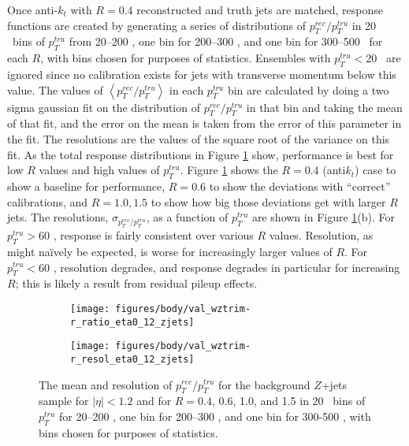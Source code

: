 Once anti-$k_t$ with $R=0.4$ reconstructed and truth jets are matched, response functions are created by generating a series of distributions of $p_T^{rec}/p_T^{tru}$ in 20 \GeV\ bins of $p_T^{tru}$ from 20--200 \GeV, one bin for 200--300 \GeV, and one bin for 300--500 \GeV\ for each $R$, with bins chosen for purposes of statistics.  Ensembles with $p_T^{tru}<20$ \GeV\ are ignored since no calibration exists for jets with transverse momentum below this value.  The values of $\left<p_T^{rec}/p_T^{tru}\right>$ in each $p_T^{tru}$ bin are calculated by doing a two sigma gaussian fit on the distribution of $p_T^{rec}/p_T^{tru}$ in that bin and taking the mean of that fit, and the error on the mean is taken from the error of this parameter in the fit.  The resolutions are the values of the square root of the variance on this fit.  As the total response distributions in Figure \ref{fig:valzjets} show, performance is best for low $R$ values and high values of $p_T^{tru}$.  Figure \ref{fig:valzjets} shows the $R=0.4$ (anti$k_t$) case to show a baseline for performance, $R=0.6$ to show the deviations with ``correct'' calibrations, and $R=1.0,1.5$ to show how big those deviations get with larger $R$ jets.  The resolutions, $\sigma_{p_T^{rec}/p_T^{tru}}$, as a function of $p_T^{tru}$ are shown in Figure \ref{fig:valzjets}(b). For $p_T^{tru}>60$ \GeV, response is fairly consistent over various $R$ values.  Resolution, as might na\"ively be expected, is worse for increasingly larger values of $R$.  For $p_T^{tru}<60$ \GeV, resolution degrades, and response degrades in particular for increasing $R$; this is likely a result from residual pileup effects.

\begin{figure}[!htbp]\captionsetup{justification=centering}
  \begin{center}
\begin{subfigure}[t]{18pc}\centering\texttt{[image: figures/body/val\_wztrim-r\_ratio\_eta0\_12\_zjets]}\caption{}\end{subfigure}
\begin{subfigure}[t]{18pc}\centering\texttt{[image: figures/body/val\_wztrim-r\_resol\_eta0\_12\_zjets]}\caption{}\end{subfigure}
  \caption{\label{fig:valzjets}The mean and resolution of $p_T^{rec}/p_T^{tru}$  for the background $Z$+jets sample for $\left|\eta\right|<1.2$ and for $R=0.4$, 0.6, 1.0, and 1.5 in 20 \GeV\ bins of $p_T^{tru}$ for 20--200 \GeV, one bin for 200--300 \GeV, and one bin for 300-500 \GeV, with bins chosen for purposes of statistics.}
  \end{center}
\end{figure}
\clearpage

